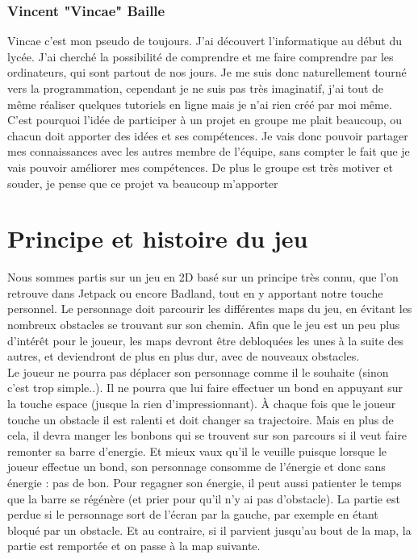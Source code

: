 \documentclass [11pt]{report}
\begin{document}
		\subsection{Vincent "Vincae" Baille}
			Vincae c'est mon pseudo de toujours. J'ai découvert l'informatique au début du lycée. J'ai cherché la possibilité de comprendre et me faire comprendre par les ordinateurs, qui sont partout de nos jours. Je me suis donc naturellement tourné vers la programmation, cependant je ne suis pas très imaginatif, j'ai tout de même réaliser quelques tutoriels en ligne mais je n'ai rien créé par moi même. C'est pourquoi l'idée de participer à un projet en groupe me plait beaucoup, ou chacun doit apporter des idées et ses compétences. Je vais donc pouvoir partager mes connaissances avec les autres membre de l'équipe, sans compter le fait que je vais pouvoir améliorer mes compétences. De plus le groupe est très motiver et souder, je pense que ce projet va beaucoup m'apporter

\chapter{Principe et histoire du jeu}

		\indent Nous sommes partis sur un jeu en 2D bas\'e sur un principe tr\`es connu, que l'on retrouve dans Jetpack ou encore Badland, tout en y apportant notre touche personnel. Le personnage doit parcourir les différentes maps du jeu, en évitant les nombreux obstacles se trouvant sur son chemin. Afin que le jeu est un peu plus 		d'intérêt pour le joueur, les maps devront être debloquées les unes à la suite des autres, et deviendront de plus en plus dur, avec de nouveaux obstacles.\\

		\indent Le joueur ne pourra pas déplacer son personnage comme il le souhaite (sinon c'est trop simple..). Il ne pourra que lui faire effectuer un bond en appuyant sur la touche espace (jusque la rien d'impressionnant). \`A chaque fois que le joueur touche un obstacle il est ralenti et doit changer sa trajectoire. Mais en plus de cela, il 	devra manger les bonbons qui se trouvent sur son parcours si il veut faire remonter sa barre d'energie. Et mieux vaux qu'il le veuille puisque lorsque le joueur effectue un bond, son personnage consomme de l'énergie et donc sans énergie : pas de bon. Pour regagner son énergie, il peut aussi patienter le temps que la barre se régénère 		(et prier pour qu'il n'y ai pas d'obstacle). La partie est perdue si le personnage sort de l'écran par la gauche, par exemple en étant bloqué par un obstacle. Et au contraire, si il parvient jusqu'au bout de la map, la partie est remportée et on passe à la map suivante.
\end{document}
